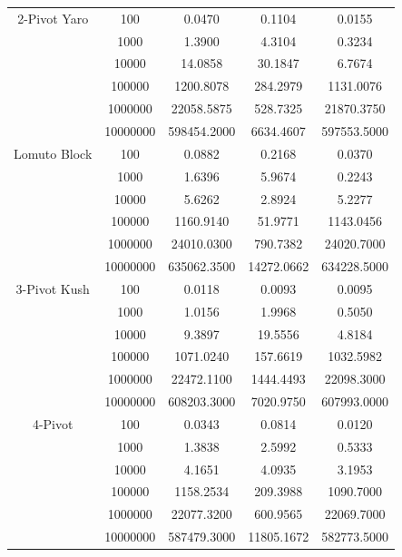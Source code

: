 \documentclass[a4paper,oneside,12pt]{book}
\begin{document}
\begin{center}
    \small
    \begin{tabular}{ |c c | c c c| }
        \hline
        2-Pivot Yaro    & 100      & 0.0470         & 0.1104        & 0.0155 \\
                        & 1000     & 1.3900         & 4.3104        & 0.3234 \\
                        & 10000    & 14.0858        & 30.1847       & 6.7674 \\
                        & 100000   & 1200.8078      & 284.2979      & 1131.0076 \\
                        & 1000000  & 22058.5875     & 528.7325      & 21870.3750 \\
                        & 10000000 & 598454.2000    & 6634.4607     & 597553.5000 \\
        Lomuto Block    & 100      & 0.0882         & 0.2168        & 0.0370 \\
                        & 1000     & 1.6396         & 5.9674        & 0.2243 \\
                        & 10000    & 5.6262         & 2.8924        & 5.2277 \\
                        & 100000   & 1160.9140      & 51.9771       & 1143.0456 \\
                        & 1000000  & 24010.0300     & 790.7382      & 24020.7000 \\
                        & 10000000 & 635062.3500    & 14272.0662    & 634228.5000 \\
        \hline
        3-Pivot Kush    & 100      & 0.0118         & 0.0093        & 0.0095 \\
                        & 1000     & 1.0156         & 1.9968        & 0.5050 \\
                        & 10000    & 9.3897         & 19.5556       & 4.8184 \\
                        & 100000   & 1071.0240      & 157.6619      & 1032.5982 \\
                        & 1000000  & 22472.1100     & 1444.4493     & 22098.3000 \\
                        & 10000000 & 608203.3000    & 7020.9750     & 607993.0000 \\
        \hline
        4-Pivot         & 100      & 0.0343         & 0.0814        & 0.0120 \\
                        & 1000     & 1.3838         & 2.5992        & 0.5333 \\
                        & 10000    & 4.1651         & 4.0935        & 3.1953 \\
                        & 100000   & 1158.2534      & 209.3988      & 1090.7000 \\
                        & 1000000  & 22077.3200     & 600.9565      & 22069.7000 \\
                        & 10000000 & 587479.3000    & 11805.1672    & 582773.5000 \\
        \hline
    \end{tabular}


\end{center}
\end{document}
